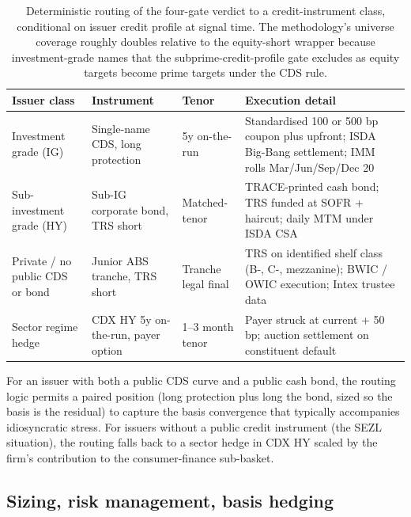 \documentclass[11pt,a4paper]{article}
\begin{document}
\begin{table}[h]
\centering\small
\begin{tabular}{@{}p{2.4cm}p{3.2cm}p{2.0cm}p{5.4cm}@{}}
\toprule
\textbf{Issuer class} & \textbf{Instrument} & \textbf{Tenor} & \textbf{Execution detail} \\
\midrule
Investment grade (IG) & Single-name CDS, long protection & 5y on-the-run & Standardised 100 or 500 bp coupon plus upfront; ISDA Big-Bang settlement; IMM rolls Mar/Jun/Sep/Dec 20 \\
Sub-investment grade (HY) & Sub-IG corporate bond, TRS short & Matched-tenor & TRACE-printed cash bond; TRS funded at SOFR + haircut; daily MTM under ISDA CSA \\
Private / no public CDS or bond & Junior ABS tranche, TRS short & Tranche legal final & TRS on identified shelf class (B-, C-, mezzanine); BWIC / OWIC execution; Intex trustee data \\
Sector regime hedge & CDX HY 5y on-the-run, payer option & 1--3 month tenor & Payer struck at current + 50 bp; auction settlement on constituent default \\
\bottomrule
\end{tabular}
\caption{Deterministic routing of the four-gate verdict to a credit-instrument class, conditional on issuer credit profile at signal time. The methodology's universe coverage roughly doubles relative to the equity-short wrapper because investment-grade names that the subprime-credit-profile gate excludes as equity targets become prime targets under the CDS rule.}\label{tab:fi_routing}
\end{table}

For an issuer with both a public CDS curve and a public cash bond, the routing logic permits a paired position (long protection plus long the bond, sized so the basis is the residual) to capture the basis convergence that typically accompanies idiosyncratic stress. For issuers without a public credit instrument (the SEZL situation), the routing falls back to a sector hedge in CDX HY scaled by the firm's contribution to the consumer-finance sub-basket.

\subsection*{Sizing, risk management, basis hedging}
\end{document}
